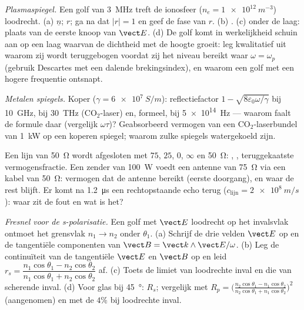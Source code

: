 \begin{exercise}[$\star\star$]\label{exo:b2:wave-interfaces:7}
\emph{Plasmaspiegel.} Een golf van \qty{3}{MHz} treft de ionosfeer
($n_e =
\qty{1e12}{m^{-3}}$) loodrecht. (a) $\underline n$; $r$; ga na dat
$|r| = 1$ en geef de fase van $r$. (b) . (c)  onder
de laag: plaats van de eerste knoop van $\vect E$. (d) De golf komt in
werkelijkheid schuin aan op een laag waarvan de dichtheid met de hoogte
groeit: leg kwalitatief uit waarom zij wordt teruggebogen voordat zij het
niveau bereikt waar $\omega = \omega_p$ (gebruik Descartes met een dalende
brekingsindex), en waarom een golf met een hogere frequentie ontsnapt.
\end{exercise}

\begin{exercise}[$\star\star$]\label{exo:b2:wave-interfaces:8}
\emph{Metalen spiegels.} Koper ($\gamma = \qty{6e7}{S/m}$): reflectiefactor
$1 -
\sqrt{8\varepsilon_0\omega/\gamma}$ bij \qty{10}{GHz}, bij
\qty{30}{THz} (CO$_2$-laser) en, formeel, bij \qty{5e14}{Hz} --- waarom
faalt de formule daar (vergelijk $\omega\tau$)? Geabsorbeerd vermogen van
een CO$_2$-laserbundel van \qty{1}{kW} op een koperen spiegel; waarom zulke
spiegels watergekoeld zijn.
\end{exercise}

\begin{exercise}[$\star\star$]\label{exo:b2:wave-interfaces:9}
Een lijn van \qty{50}{\ohm} wordt afgesloten met $75$, $25$, $0$, $\infty$
en \qty{50}{\ohm}: , ,
teruggekaatste vermogensfractie. Een zender van \qty{100}{W} voedt een
antenne van \qty{75}{\ohm} via een kabel van \qty{50}{\ohm}: vermogen dat de
antenne bereikt (eerste doorgang), en waar de rest blijft. Er komt na
\qty{1.2}{\micro s} een rechtopstaande echo terug
($c_{\text{lijn}}
= \qty{2e8}{m/s}$): waar zit de fout en wat is het?
\end{exercise}

\begin{exercise}[$\star\star\star$]\label{exo:b2:wave-interfaces:10}
\emph{Fresnel voor de s-polarisatie.} Een golf met $\vect E$ loodrecht op
het invalsvlak ontmoet het grensvlak $n_1 \to n_2$ onder $\theta_1$. (a)
Schrijf de drie velden $\vect E$ op en de tangentiële componenten van
$\vect B = \vect k\wedge\vect E/\omega$. (b) Leg de continuïteit van de
tangentiële $\vect E$ en $\vect B$ op en leid
$r_s = \dfrac{n_1\cos\theta_1 - n_2\cos\theta_2}
{n_1\cos\theta_1 + n_2\cos\theta_2}$
af. (c) Toets de limiet van loodrechte inval en die van scherende inval. (d)
Voor glas bij \qty{45}{\degree}: $R_s$; vergelijk met
$R_p
= \bigl(\frac{n_2\cos\theta_1 - n_1\cos\theta_2}{n_2\cos\theta_1 + n_1\cos\theta_2}\bigr)^2$
(aangenomen) en met de $4\%$ bij loodrechte inval.
\end{exercise}

